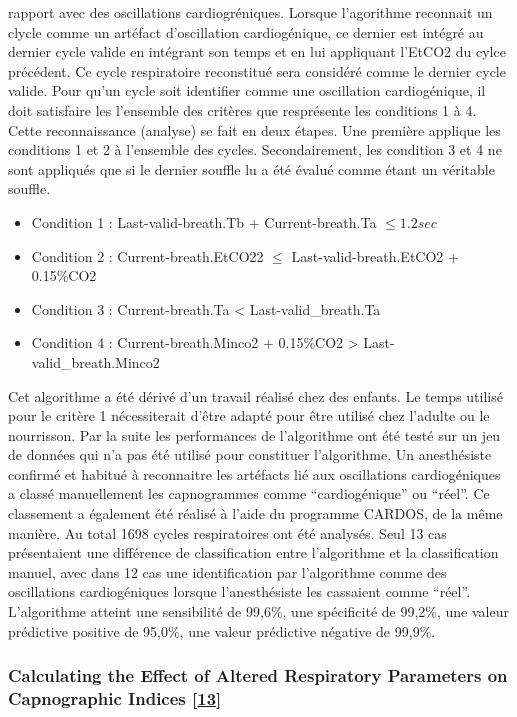 \documentclass[12pt,]{article}
\providecommand{\tightlist}{%
  \setlength{\itemsep}{0pt}\setlength{\parskip}{0pt}}
\begin{document}
rapport avec des oscillations cardiogréniques. Lorsque l'agorithme
reconnait un clycle comme un artéfact d'oscillation cardiogénique, ce
dernier est intégré au dernier cycle valide en intégrant son temps et en
lui appliquant l'EtCO2 du cylce précédent. Ce cycle respiratoire
reconstitué sera considéré comme le dernier cycle valide. Pour qu'un
cycle soit identifier comme une oscillation cardiogénique, il doit
satisfaire les l'ensemble des critères que resprésente les conditions 1
à 4. Cette reconnaissance (analyse) se fait en deux étapes. Une première
applique les conditions 1 et 2 à l'ensemble des cycles. Secondairement,
les condition 3 et 4 ne sont appliqués que si le dernier souffle lu a
été évalué comme étant un véritable souffle.

\begin{itemize}
\tightlist
\item
  Condition 1 : Last-valid-breath.Tb + Current-breath.Ta
  \(\leqslant 1.2 sec\)
\item
  Condition 2 : Current-breath.EtCO22 \(\leqslant\)
  Last-valid-breath.EtCO2 + 0.15\%CO2
\item
  Condition 3 : Current-breath.Ta \textless{} Last-valid\_breath.Ta
\item
  Condition 4 : Current-breath.Minco2 + 0.15\%CO2 \textgreater{}
  Last-valid\_breath.Minco2
\end{itemize}

Cet algorithme a été dérivé d'un travail réalisé chez des enfants. Le
temps utilisé pour le critère 1 nécessiterait d'être adapté pour être
utilisé chez l'adulte ou le nourrisson. Par la suite les performances de
l'algorithme ont été testé sur un jeu de données qui n'a pas été utilisé
pour constituer l'algorithme. Un anesthésiste confirmé et habitué à
reconnaitre les artéfacts lié aux oscillations cardiogéniques a classé
manuellement les capnogrammes comme ``cardiogénique'' ou ``réel''. Ce
classement a également été réalisé à l'aide du programme CARDOS, de la
même manière. Au total 1698 cycles respiratoires ont été analysés. Seul
13 cas présentaient une différence de classification entre l'algorithme
et la classification manuel, avec dans 12 cas une identification par
l'algorithme comme des oscillations cardiogéniques lorsque
l'anesthésiste les cassaient comme ``réel''. L'algorithme atteint une
sensibilité de 99,6\%, une spécificité de 99,2\%, une valeur prédictive
positive de 95,0\%, une valeur prédictive négative de 99,9\%.

\hypertarget{calculating-the-effect-of-altered-respiratory-parameters-on-capnographic-indices-roy2007calculating}{%
\subsubsection{\texorpdfstring{Calculating the Effect of Altered
Respiratory Parameters on Capnographic Indices
{[}\protect\hyperlink{ref-roy2007calculating}{13}{]}}{Calculating the Effect of Altered Respiratory Parameters on Capnographic Indices {[}13{]}}}\label{calculating-the-effect-of-altered-respiratory-parameters-on-capnographic-indices-roy2007calculating}}
\end{document}
